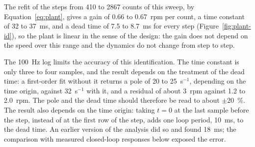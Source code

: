 The refit of the steps from 410 to 2867 counts of this sweep, by Equation~\ref{eq:plant}, gives a gain of 0.66 to 0.67~rpm per count, a time constant of 32 to 37~ms, and a dead time of 7.5 to 8.7~ms for every step (Figure~\ref{fig:plant-id}), so the plant is linear in the sense of the design: the gain does not depend on the speed over this range and the dynamics do not change from step to step.

The 100~Hz log limits the accuracy of this identification. The time constant is only three to four samples, and the result depends on the treatment of the dead time: a first-order fit without it returns a pole of 20 to 25~s$^{-1}$, depending on the time origin, against 32~s$^{-1}$ with it, and a residual of about 3~rpm against 1.2 to 2.0~rpm. The pole and the dead time should therefore be read to about $\pm 20$~\%. The result also depends on the time origin: taking $t = 0$ at the last sample before the step, instead of at the first row of the step, adds one loop period, 10~ms, to the dead time. An earlier version of the analysis did so and found 18~ms; the comparison with measured closed-loop responses below exposed the error.

